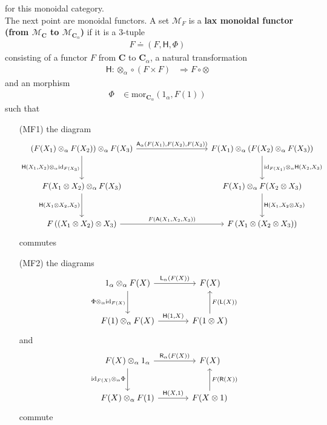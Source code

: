 for this monoidal category.
\\
The next point are monoidal functors. A set $\mathcal{M}_{F}$ is a \textbf{lax monoidal functor (from $\mathcal{M}_{\mathbf{C}}$ to $\mathcal{M}_{\mathbf{C}_{\alpha}}$)} if it is a $3$-tuple
\begin{align*}
  F
  \doteq
  \left(
    F,
    \mathsf{H},
    \Phi
  \right)
\end{align*}
consisting of a functor $F$ from $\mathbf{C}$ to $\mathbf{C}_{\alpha}$, a natural transformation
\begin{align*}
  \mathsf{H}
  \colon
  \otimes_{\alpha}
  \circ
  \left(
    F
    \times
    F
  \right)
  &\Rightarrow
  F
  \circ
  \otimes
\end{align*}
and an morphism
\begin{align*}
  \Phi
  &\in
  \mathrm{mor}_{\mathbf{C}_{\alpha}}(1_{\alpha},F(1))
\end{align*}
such that
\begin{enumerate}
\item[(MF1)]
the diagram
\[
\begin{tikzcd}[row sep=3em, column sep=9em]
  (F(X_{1}) \otimes_{\alpha} F(X_{2}))
  \otimes_{\alpha}
  F(X_{3})
  \arrow{r}{\mathsf{A}_{\alpha}(F(X_{1}),F(X_{2}),F(X_{3}))}
  \arrow[swap]{d}{\mathsf{H}(X_{1},X_{2})\otimes_{\alpha}\mathrm{id}_{F(X_{3})}}
  &
  F(X_{1})
  \otimes_{\alpha}
  (F(X_{2}) \otimes_{\alpha} F(X_{3}))
  \arrow{d}{\mathrm{id}_{F(X_{1})} \otimes_{\alpha} \mathsf{H}(X_{2},X_{3})}
  \\
  F(X_{1} \otimes X_{2})
  \otimes_{\alpha}
  F(X_{3})
  \arrow[swap]{d}{\mathsf{H}(X_{1} \otimes X_{2},X_{3})}
  &
  F(X_{1})
  \otimes_{\alpha}
  F(X_{2} \otimes X_{3})
  \arrow{d}{\mathsf{H}(X_{1},X_{2} \otimes X_{3})}
  \\
  F
  \left(
    (X_{1} \otimes X_{2})
    \otimes
    X_{3}
  \right)
  \arrow{r}{F(\mathsf{A}(X_{1},X_{2},X_{3}))}
  &
  F
  \left(
    X_{1}
    \otimes
    (X_{2} \otimes X_{3})
  \right)
\end{tikzcd}
\]
commutes
\item[(MF2)]
the diagrams
\[
\begin{tikzcd}[sep=large]
  1_{\alpha}
  \otimes_{\alpha}
  F(X)
  \arrow{r}{\mathsf{L}_{\alpha}(F(X))}
  \arrow[swap]{d}{\Phi \otimes_{\alpha} \mathrm{id}_{F(X)}}
  &
  F(X)
  \\
  F(1)
  \otimes_{\alpha}
  F(X)
  \arrow{r}{\mathsf{H}(1,X)}
  &
  F(1 \otimes X)
  \arrow[swap]{u}{F(\mathsf{L}(X))}
\end{tikzcd}
\]
and
\[
\begin{tikzcd}[sep=large]
  F(X)
  \otimes_{\alpha}
  1_{\alpha}
  \arrow{r}{\mathsf{R}_{\alpha}(F(X))}
  \arrow[swap]{d}{\mathrm{id}_{F(X)} \otimes_{\alpha} \Phi}
  &
  F(X)
  \\
  F(X)
  \otimes_{\alpha}
  F(1)
  \arrow{r}{\mathsf{H}(X,1)}
  &
  F(X \otimes 1)
  \arrow[swap]{u}{F(\mathsf{R}(X))}
\end{tikzcd}
\]
commute
\end{enumerate}

